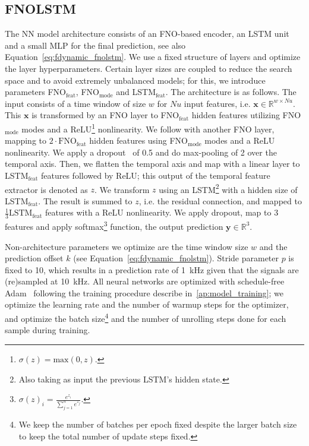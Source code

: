 \subsection{FNOLSTM}
The NN model architecture consists of an FNO-based encoder, an LSTM unit and a small MLP for the final prediction, see also Equation~\ref{eq:fdynamic_fnolstm}. We use a fixed structure of layers and optimize the layer hyperparameters. Certain layer sizes are coupled to reduce the search space and to avoid extremely unbalanced models; for this, we introduce parameters FNO$_\text{feat}$, FNO$_\text{mode}$ and LSTM$_\text{feat}$. The architecture is as follows. The input consists of a time window of size $w$ for $\textit{Nu}$ input features, i.e. $\mathbf{x} \in \mathbb{R}^{w \times \textit{Nu}}$. This $\mathbf{x}$ is transformed by an FNO layer to FNO$_\text{feat}$ hidden features utilizing FNO$_\text{mode}$ modes and a ReLU\footnote{$\sigma(z) = \text{max}(0, z).$} nonlinearity. We follow with another FNO layer, mapping to $2 \cdot \text{FNO}_\text{feat}$ hidden features using FNO$_\text{mode}$ modes and a ReLU nonlinearity. We apply a dropout~\cite{dropout2014} of 0.5 and do max-pooling of 2 over the temporal axis. Then, we flatten the temporal axis and map with a linear layer to LSTM$_\text{feat}$ features followed by ReLU; this output of the temporal feature extractor is denoted as $z$. We transform $z$ using an LSTM\footnote{Also taking as input the previous LSTM's hidden state.} with a hidden size of LSTM$_\text{feat}$. The result is summed to $z$, i.e. the residual connection, and mapped to $\frac{1}{3}\text{LSTM}_\text{feat}$ features with a ReLU nonlinearity. We apply dropout, map to 3 features and apply softmax\footnote{$\sigma(z)_i = \frac{e^{z_i}}{\sum_{j=1}^{n} e^{z_j}}$.} function, the output prediction $\mathbf{y} \in \mathbb{R}^3$.




Non-architecture parameters we optimize are the time window size $w$ and the prediction offset $k$ (see Equation~\ref{eq:fdynamic_fnolstm}). Stride parameter $p$ is fixed to 10, which results in a prediction rate of \SI{1}{\kilo\hertz} given that the signals are (re)sampled at \SI{10}{\kilo\hertz}. All neural networks are optimized with schedule-free Adam~\cite{defazio2024} following the training procedure describe in~\ref{ap:model_training}; we optimize the learning rate and the number of warmup steps for the optimizer, and optimize the batch size\footnote{We keep the number of batches per epoch fixed despite the larger batch size to keep the total number of update steps fixed.} and the number of unrolling steps done for each sample during training.

